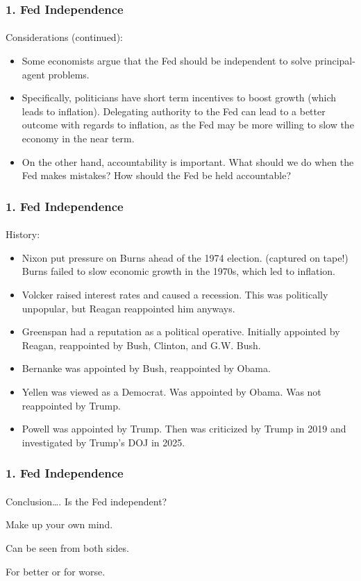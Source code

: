 \documentclass{beamer}
\begin{document}
\begin{frame}[t]
    \frametitle{1. Fed Independence}
    \framesubtitle{}
    
    Considerations (continued):
    \begin{itemize}
        \item Some economists argue that the Fed should be independent to solve principal-agent problems.
        \item Specifically, politicians have short term incentives to boost growth (which leads to inflation).   Delegating authority to the Fed can lead to a better outcome with regards to inflation, as the Fed may be more willing to slow the economy in the near term.
        \item On the other hand, accountability is important.  What should we do when the Fed makes mistakes?   How should the Fed be held accountable?
    \end{itemize}

\end{frame}

\begin{frame}[t]
    \frametitle{1. Fed Independence}
    \framesubtitle{}

    History:
    \begin{itemize}
        \item Nixon put pressure on Burns ahead of the 1974 election. (captured on tape!)   Burns failed to slow economic growth in the 1970s, which led to inflation.
        \item Volcker raised interest rates and caused a recession.  This was politically unpopular, but Reagan reappointed him anyways.
        \item Greenspan had a reputation as a political operative.   Initially appointed by Reagan, reappointed by Bush, Clinton, and G.W. Bush.
        \item Bernanke was appointed by Bush, reappointed by Obama.
        \item Yellen was viewed as a Democrat.  Was appointed by Obama.   Was not reappointed by Trump.
        \item Powell was appointed by Trump.  Then was criticized by Trump in 2019 and investigated by Trump's DOJ in 2025.
    \end{itemize}
    
\end{frame}


\begin{frame}[t]
    \frametitle{1. Fed Independence}
    \framesubtitle{}

    Conclusion….  Is the Fed independent?
    \vspace{1em}

    Make up your own mind.   
    \vspace{1em}
    
    Can be seen from both sides.   
    \vspace{1em}
    
    For better or for worse.
    \vspace{1em}


\end{frame}
\end{document}
